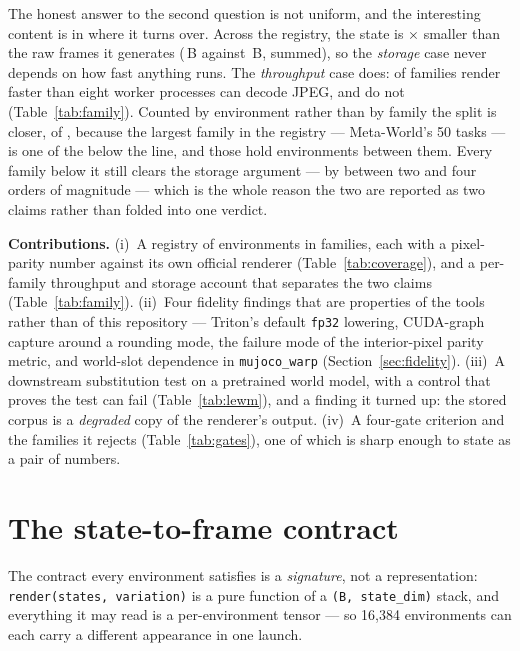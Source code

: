 \documentclass{article}
\begin{document}
The honest answer to the second question is not uniform, and the interesting
content is in where it turns over. Across the registry, the state is
\seStorageRatio$\times$ smaller than the raw frames it generates
(\seStorageStateB\,B against \seStorageRawB\,B, summed), so the
\emph{storage} case never depends on how fast anything runs. The
\emph{throughput} case does: \seNfamAbove{} of \seNfamRated{} families render
faster than eight worker processes can decode JPEG, and \seNfamBelow{} do not
(Table~\ref{tab:family}). Counted by environment rather than by family the
split is closer, \seNabove{} of \seNrated{}, because the largest family in the
registry --- Meta-World's 50 tasks --- is one of the \seNfamBelow{} below the
line, and those \seNfamBelow{} hold \seNenvBelow{} environments between them. Every family below it still clears the storage
argument --- by between two and four orders of magnitude --- which is the whole
reason the two are reported as two claims rather than folded into one verdict.

\textbf{Contributions.} (i)~A registry of \seNenvs{} environments in
\seNfamilies{} families, each with a pixel-parity number against its own
official renderer (Table~\ref{tab:coverage}), and a per-family throughput and
storage account that separates the two claims (Table~\ref{tab:family}).
(ii)~Four fidelity findings that are properties of the tools rather than of
this repository --- Triton's default \texttt{fp32} lowering, CUDA-graph capture
around a rounding mode, the failure mode of the interior-pixel parity metric,
and world-slot dependence in \texttt{mujoco\_warp} (Section~\ref{sec:fidelity}).
(iii)~A downstream substitution test on a pretrained world model, with a
control that proves the test can fail (Table~\ref{tab:lewm}), and a finding it
turned up: the stored corpus is a \emph{degraded} copy of the renderer's
output. (iv)~A four-gate criterion and the families it rejects
(Table~\ref{tab:gates}), one of which is sharp enough to state as a pair of
numbers.

\section{The state-to-frame contract}

The contract every environment satisfies is a \emph{signature}, not a
representation: \texttt{render(states, variation)} is a pure function of a
\texttt{(B, state\_dim)} stack, and everything it may read is a
per-environment tensor --- so 16,384 environments can each carry a different
appearance in one launch.
\end{document}

